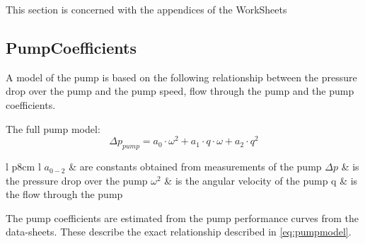 This section is concerned with the appendices of the WorkSheets

\subsection{PumpCoefficients}

A model of the pump is based on the following relationship between the pressure drop over the pump and the pump speed, flow through the pump and the pump coefficients.

The full pump model:
\begin{equation} \label{eq:pumpmodel}
		\Delta p_{pump}  = a_0  \cdot \omega^2 + a_1 \cdot q \cdot \omega + a_2 \cdot q^2
\end{equation}

\begin{center}
	\begin{tabular}{l p{8cm} l}
		$a_{0-2}$ & are constants obtained from measurements of the pump
		$\Delta p$ & is the pressure drop over the pump
		$\omega ^2$ & is the angular velocity of the pump
		q & is the flow through the pump
	\end{tabular}
\end{center}

The pump coefficients are estimated from the pump performance curves from the data-sheets. These describe the exact relationship described in \cref{eq:pumpmodel}.